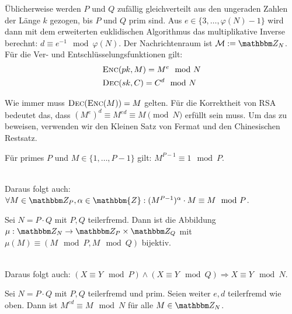 Üblicherweise werden $P$ und $Q$ zufällig gleichverteilt aus den ungeraden Zahlen der Länge $k$ gezogen, bis $P$ und $Q$ prim sind. Aus $e \in \{3, \dotsc ,
\varphi(N) - 1\}$ wird dann mit dem erweiterten euklidischen Algorithmus das multiplikative Inverse berechnt: $d \equiv e^{-1} \mod \varphi(N)$. Der Nachrichtenraum ist $\mathcal
M := \Z N$. Für die Ver- und Entschlüsselungsfunktionen gilt:
\begin{align*}
& \textsc{Enc}(pk, M) = M^e \mod N\\
& \textsc{Dec}(sk, C) = C^d \mod N
\end{align*}

Wie immer muss $\textsc{Dec}(\textsc{Enc}(M)) = M$ gelten. Für die Korrektheit von RSA bedeutet das, dass $(M^e)^d \equiv M^{ed} \equiv M \pmod N$ erfüllt sein muss. Um das zu beweisen,
verwenden wir den Kleinen Satz von Fermat und den Chinesischen Restsatz.

\vspace{10pt}
\begin{theorem}
Für primes $P$ und $M \in \{1, \dotsc, P-1\}$ gilt: $M^{P-1} \equiv 1 \mod P$.
\end{theorem}

~\\
Daraus folgt auch: $\forall M \in \Z P, \alpha \in \mathbbm{Z} : (M^{P-1})^{\alpha} \cdot M \equiv M \mod P$.

\vspace{10pt}
\begin{theorem}
Sei $N = P \cdot Q$ mit $P, Q$ teilerfremd. Dann ist die Abbildung $\mu : \Z N \rightarrow \Z P \times \Z Q$ mit $\mu(M) \equiv (M \mod P, M \mod Q)$ bijektiv.
\end{theorem}

~\\
Daraus folgt auch: $(X \equiv Y \mod P) \land (X \equiv Y \mod Q) \Rightarrow X \equiv Y \mod N$.

\vspace{10pt}
\begin{theorem}
Sei $N = P \cdot Q$ mit $P, Q$ teilerfremd und prim. Seien weiter $e, d$ teilerfremd wie oben. Dann ist $M^{ed} \equiv M \mod N$ für alle $M \in \Z N$.
\end{theorem}
\vspace{10pt}

